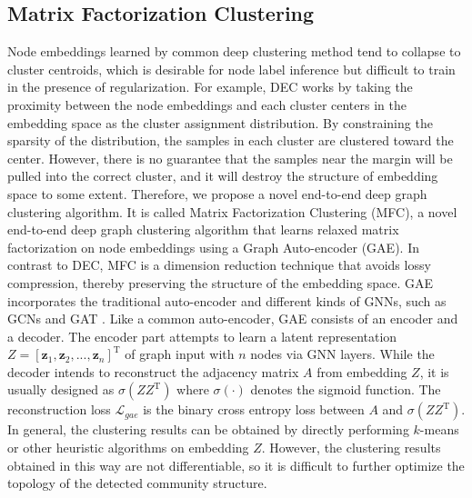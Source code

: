 \documentclass[letterpaper]{article} %
\begin{document}
\subsection{Matrix Factorization Clustering}
Node embeddings learned by common deep clustering method tend to collapse to cluster centroids, which is desirable for node label inference but difficult to train in the presence of regularization. For example, DEC works by taking the proximity between the node embeddings and each cluster centers in the embedding space as the cluster assignment distribution. By constraining the sparsity of the distribution, the samples in each cluster are clustered toward the center. However, there is no guarantee that the samples near the margin will be pulled into the correct cluster, and it will destroy the structure of embedding space to some extent. Therefore, we propose a novel end-to-end deep graph clustering algorithm. It is called Matrix Factorization Clustering (MFC), a novel end-to-end deep graph clustering algorithm that learns relaxed matrix factorization on node embeddings using a Graph Auto-encoder (GAE). In contrast to DEC, MFC is a dimension reduction technique that avoids lossy compression, thereby preserving the structure of the embedding space.
GAE incorporates the traditional auto-encoder and different kinds of GNNs, such as GCNs \cite{zhang2019graph} and GAT \cite{salehi2020graph}. Like a common auto-encoder, GAE consists of an encoder and a decoder. The encoder part attempts to learn a latent representation $Z=[\boldsymbol{z}_1,\boldsymbol{z}_2,...,\boldsymbol{z}_n]^\mathrm{T}$ of graph input with $n$ nodes via GNN layers. While the decoder intends to reconstruct the adjacency matrix $A$ from embedding $Z$, it is usually designed as $\sigma(ZZ^\mathrm{T})$ where $\sigma(\cdot)$ denotes the sigmoid function. The reconstruction loss $\mathcal{L}_{gae}$ is the binary cross entropy loss between $A$ and $\sigma(ZZ^\mathrm{T})$. %
In general, the clustering results can be obtained by directly performing $k$-means or other heuristic algorithms on embedding $Z$. However, the clustering results obtained in this way are not differentiable, so it is difficult to further optimize the topology of the detected community structure.   
\end{document}
